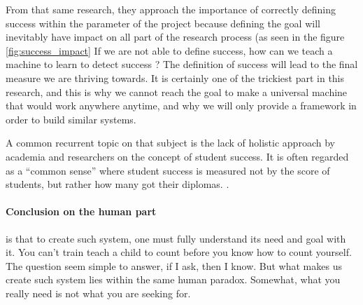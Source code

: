 \documentclass[../../main.tex]{subfiles}
\begin{document}
From that same research, they approach the importance of correctly defining success within the parameter of the project because defining the goal will inevitably have impact on all part of the research process (as seen in the figure \ref{fig:success_impact}
If we are not able to define success, how can we teach a machine to learn to detect success ? The definition of success will lead to the final measure we are thriving towards. It is certainly one of the trickiest part in this research, and this is why we cannot reach the goal to make a universal machine that would work anywhere anytime, and why we will only provide a framework in order to build similar systems. 

A common recurrent topic on that subject is the lack of holistic approach by academia and researchers on the concept of student success. It is often regarded as a “common sense” where student success is measured not by the score of students, but rather how many got their diplomas. \cite{weatherton_success_2021}.

\paragraph{Conclusion on the human part} is that to create such system, one must fully understand its need and goal with it. You can't train teach a child to count before you know how to count yourself. The question seem simple to answer, if I ask, then I know. But what makes us create such system lies within the same human paradox. Somewhat, what you really need is not what you are seeking for.
\end{document}
